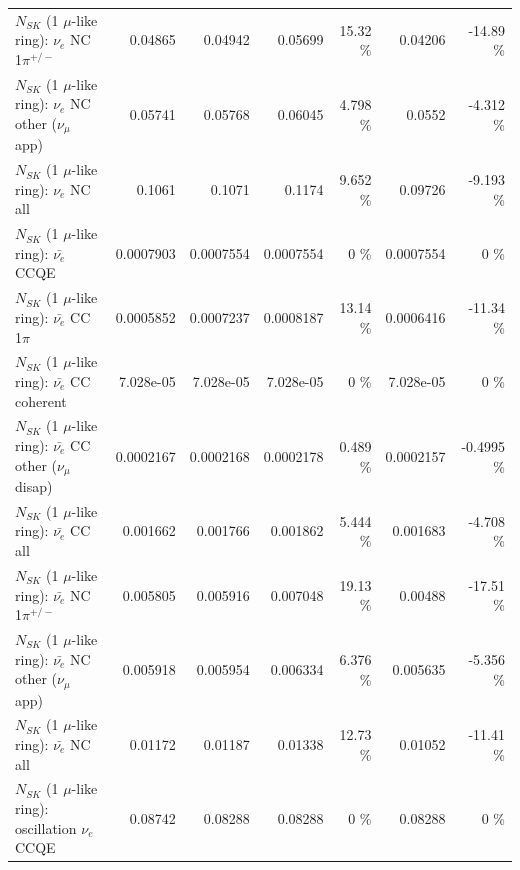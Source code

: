 \begin{table}
\begin{tabular}{| l | r | r | r  r | r  r |}
\hline
                           $N_{SK}$ (1 $\mu$-like ring): $\nu_e$ NC 1$\pi^{+/-}$ &         0.04865 &         0.04942 &         0.05699 &    15.32 \%  &         0.04206 &   -14.89 \%  \\ 
                  $N_{SK}$ (1 $\mu$-like ring): $\nu_e$ NC other ($\nu_\mu$ app) &         0.05741 &         0.05768 &         0.06045 &    4.798 \%  &          0.0552 &   -4.312 \%  \\ 
                                  $N_{SK}$ (1 $\mu$-like ring): $\nu_{e}$ NC all &          0.1061 &          0.1071 &          0.1174 &    9.652 \%  &         0.09726 &   -9.193 \%  \\ 
\hline
\hline
\hline
                                $N_{SK}$ (1 $\mu$-like ring): $\bar{\nu_e}$ CCQE &       0.0007903 &       0.0007554 &       0.0007554 &        0 \%  &       0.0007554 &        0 \%  \\ 
                           $N_{SK}$ (1 $\mu$-like ring): $\bar{\nu_e}$ CC 1$\pi$ &       0.0005852 &       0.0007237 &       0.0008187 &    13.14 \%  &       0.0006416 &   -11.34 \%  \\ 
                         $N_{SK}$ (1 $\mu$-like ring): $\bar{\nu_e}$ CC coherent &       7.028e-05 &       7.028e-05 &       7.028e-05 &        0 \%  &       7.028e-05 &        0 \%  \\ 
          $N_{SK}$ (1 $\mu$-like ring): $\bar{\nu_e}$ CC other ($\nu_\mu$ disap) &       0.0002167 &       0.0002168 &       0.0002178 &    0.489 \%  &       0.0002157 &  -0.4995 \%  \\ 
                            $N_{SK}$ (1 $\mu$-like ring): $\bar{\nu_{e}}$ CC all &        0.001662 &        0.001766 &        0.001862 &    5.444 \%  &        0.001683 &   -4.708 \%  \\ 
\hline
                     $N_{SK}$ (1 $\mu$-like ring): $\bar{\nu_e}$ NC 1$\pi^{+/-}$ &        0.005805 &        0.005916 &        0.007048 &    19.13 \%  &         0.00488 &   -17.51 \%  \\ 
            $N_{SK}$ (1 $\mu$-like ring): $\bar{\nu_e}$ NC other ($\nu_\mu$ app) &        0.005918 &        0.005954 &        0.006334 &    6.376 \%  &        0.005635 &   -5.356 \%  \\ 
                            $N_{SK}$ (1 $\mu$-like ring): $\bar{\nu_{e}}$ NC all &         0.01172 &         0.01187 &         0.01338 &    12.73 \%  &         0.01052 &   -11.41 \%  \\ 
\hline
\hline
\hline
                          $N_{SK}$ (1 $\mu$-like ring): oscillation $\nu_e$ CCQE &         0.08742 &         0.08288 &         0.08288 &        0 \%  &         0.08288 &        0 \%  \\ 

\end{tabular}
\end{table}
